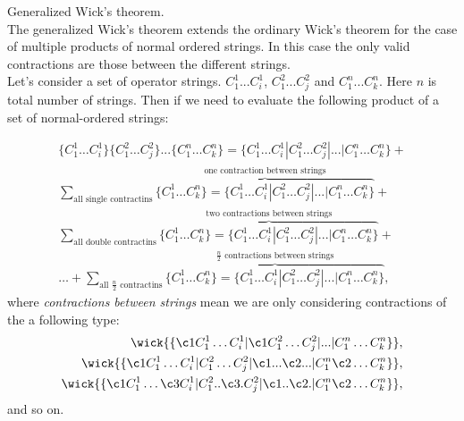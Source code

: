 \documentclass[twoside,english]{uiofysmaster}
\theoremstyle{definition}
\begin{document}
\begin{theorem} Generalized Wick's theorem.\\
The generalized Wick's theorem extends the ordinary Wick's theorem for the case of multiple products of normal ordered strings. In this case the only valid contractions are those between the different strings.\\
Let's consider a set of operator strings. $C^1_1 ...C^1_i$, $C^2_1 ...C^2_j$ and $C^n_1 ...C^n_k$. Here $n$ is total number of strings. Then if we need to evaluate the following product of a set of normal-ordered strings:

\begin{align}
\{C_1^1 \dots C_i^1\}\{C_1^2 \dots C_j^2\} ... \{C_1^n \dots C_k^n\} = \{C_1^1 \dots C_i^1|C_1^2 \dots C_j^2| ...| C_1^n \dots C_k^n\} + \nonumber \\
\sum_{\text{all single contractins}} \overbrace{ \{C_1^1 \dots C_k^n\}= \{C_1^1 \dots C_i^1|C_1^2 \dots C_j^2| ...| C_1^n \dots C_k^n\} }^\text{one contraction between strings} + \nonumber \\ \sum_{\text{all double contractins}} \overbrace{ \{C_1^1 \dots C_k^n\}= \{C_1^1 \dots C_i^1|C_1^2 \dots C_j^2| ...| C_1^n \dots C_k^n\} }^\text{two contractions between strings}+\nonumber \\ \dots + 
\sum_{\text{all $\frac{n}{2}$ contractins}} \overbrace{ \{C_1^1 \dots C_k^n\}= \{C_1^1 \dots C_i^1|C_1^2 \dots C_j^2| ...| C_1^n \dots C_k^n\} }^\text{$\frac{n}{2}$ contractions  between strings},
\end{align}
where \textit{contractions between strings} mean we are only considering contractions of the a following type:
	\begin{align}
	\wick{\{\c1 C_1^1 \dots C_i^1|\c1 C_1^2 \dots C_j^2| ...| C_1^n \dots C_k^n\}},\\
	\wick{\{\c1 C_1^1 \dots  C_i^1|  C_1^2 \dots C_j^2|\c1 ... \c2... | C_1^n \c2 \dots C_k^n\}},\\
	\wick{\{\c1 C_1^1 \dots \c3 C_i^1|   C_1^2 ..\c3. C_j^2|\c1 .. \c2. | C_1^n \c2 \dots C_k^n\}},
	\end{align}
	and so on. 
\end{theorem}




 
\end{document}
